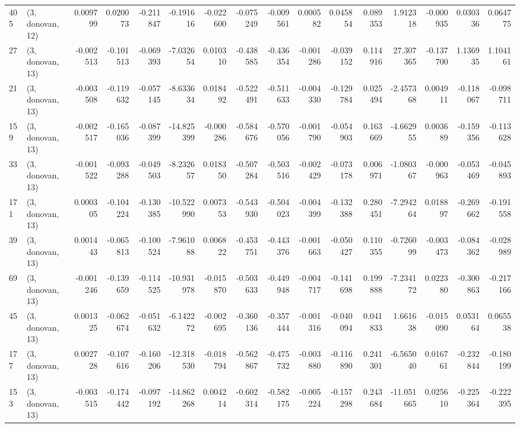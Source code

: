 \begin{tabular}{llrrrrrrrrrrrrrr}
405 &  (3, donovan, 12) &   0.009799 &  0.020073 & -0.211847 &   -0.191616 & -0.022600 &  -0.075249 & -0.009561 &  0.000582 &  0.045854 &  0.089353 &    1.912318 & -0.000935 &  0.030336 &  0.064775 \\
27  &  (3, donovan, 13) &  -0.002513 & -0.101513 & -0.069393 &   -7.032654 &  0.010310 &  -0.438585 & -0.436354 & -0.001286 & -0.039152 &  0.114916 &   27.307365 & -0.137700 &  1.136935 &  1.104161 \\
21  &  (3, donovan, 13) &  -0.003508 & -0.119632 & -0.057145 &   -8.633634 &  0.018492 &  -0.522491 & -0.511633 & -0.004330 & -0.129784 &  0.025494 &   -2.457368 &  0.004911 & -0.118067 & -0.098711 \\
159 &  (3, donovan, 13) &  -0.002517 & -0.165036 & -0.087399 &  -14.825399 & -0.000286 &  -0.584676 & -0.570056 & -0.001790 & -0.054903 &  0.163669 &   -4.662955 &  0.003689 & -0.159356 & -0.113628 \\
33  &  (3, donovan, 13) &  -0.001522 & -0.093288 & -0.049503 &   -8.232657 &  0.018350 &  -0.507284 & -0.503516 & -0.002429 & -0.073178 &  0.006971 &   -1.080367 & -0.000963 & -0.053469 & -0.045893 \\
171 &  (3, donovan, 13) &   0.000305 & -0.104224 & -0.130385 &  -10.522990 &  0.007353 &  -0.543930 & -0.504023 & -0.004399 & -0.132388 &  0.280451 &   -7.294264 &  0.018897 & -0.269662 & -0.191558 \\
39  &  (3, donovan, 13) &   0.001443 & -0.065813 & -0.100524 &   -7.961088 &  0.006822 &  -0.453751 & -0.443376 & -0.001663 & -0.050427 &  0.110355 &   -0.726099 & -0.003473 & -0.084362 & -0.028989 \\
69  &  (3, donovan, 13) &  -0.001246 & -0.139659 & -0.114525 &  -10.931978 & -0.015870 &  -0.503633 & -0.449948 & -0.004717 & -0.141698 &  0.199888 &   -7.234172 &  0.022380 & -0.300863 & -0.217166 \\
45  &  (3, donovan, 13) &   0.001325 & -0.062674 & -0.051632 &   -6.142272 & -0.002695 &  -0.360136 & -0.357444 & -0.001316 & -0.040094 &  0.041833 &    1.661638 & -0.015090 &  0.053164 &  0.065538 \\
177 &  (3, donovan, 13) &   0.002728 & -0.107616 & -0.160206 &  -12.318530 & -0.018794 &  -0.562867 & -0.475732 & -0.003880 & -0.116890 &  0.241301 &   -6.565040 &  0.016761 & -0.232844 & -0.180199 \\
153 &  (3, donovan, 13) &  -0.003515 & -0.174442 & -0.097192 &  -14.862268 &  0.004214 &  -0.602314 & -0.582175 & -0.005224 & -0.157298 &  0.243684 &  -11.051665 &  0.025610 & -0.225364 & -0.222395 \\

\end{tabular}
